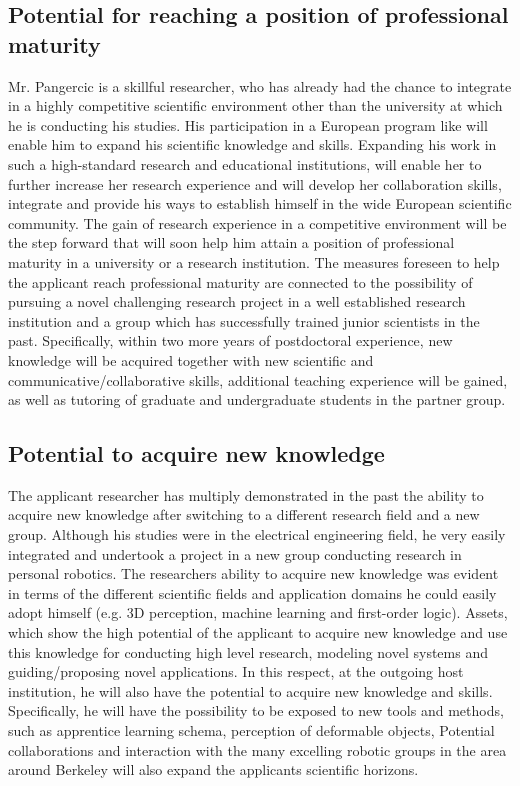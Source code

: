 \subsection{Potential for reaching a position of professional maturity}
Mr. Pangercic is a skillful researcher, who has already had the chance to integrate in a highly 
competitive scientific environment other than the university at which he is conducting his
studies.  His participation in a European program like \ksem will enable him to expand 
his scientific knowledge and skills. Expanding his work in such a high-standard research 
and educational institutions, will enable her to further increase her 
research experience and will develop her collaboration skills, integrate and  provide his 
ways to establish himself in the wide European scientific community. The gain of research 
experience in a competitive environment will be the step forward that will soon help him
attain a position of professional maturity in a university or a research institution. The 
measures foreseen to help the applicant reach professional maturity are connected to the 
possibility of pursuing a novel challenging research project in a well established research 
institution and a group which has successfully trained junior scientists in the past. 
Specifically, within two more years of postdoctoral experience, new knowledge will be 
acquired together with new scientific and communicative/collaborative skills, additional 
teaching experience will be gained, as well as tutoring of graduate and undergraduate 
students in the partner group. \\
\subsection{Potential to acquire new knowledge}
The applicant researcher has multiply demonstrated in the past the ability to acquire new 
knowledge after switching to a different research field and a new group. Although his
studies were in the electrical engineering field, he very 
easily integrated and undertook a project in a new group conducting  research in personal
robotics. The researchers ability to acquire new knowledge was evident in terms of 
the different scientific fields and application domains he could easily adopt himself (e.g. 3D perception, machine
learning and first-order logic). Assets, which show the high potential of the applicant to acquire new 
knowledge and use this knowledge for conducting high level research, modeling novel 
systems and guiding/proposing novel applications. In this respect, at the 
outgoing host institution, he will also have the potential to acquire new knowledge and skills. 
Specifically, he will have the possibility to be exposed to new tools and methods, such as 
apprentice learning schema, perception of deformable objects, 
Potential collaborations and interaction with the many excelling 
robotic groups in the area around Berkeley will also 
expand the applicants scientific horizons. 

\newpage
